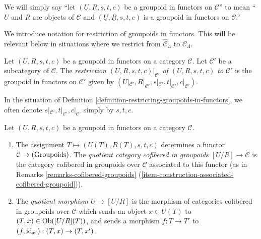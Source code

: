\begin{remark}
\label{remark-simplify-terminology}
We will simply say ``let $(\underline{U}, \underline{R}, s,t,c)$ be a groupoid 
in functors on $\mathcal C$'' to mean ``$U$ and $R$ are objects of $\mathcal C$ 
and $(\underline{U}, \underline{R}, s,t,c)$ is a groupoid in functors on 
$\mathcal C$.''
\end{remark}

\noindent
We introduce notation for restriction of groupoids in functors. This will be 
relevant below in situations where we restrict from $\widehat{\mathcal 
C}_{\Lambda}$ to $\mathcal C_{\Lambda}$.

\begin{definition}
\label{definition-restricting-groupoids-in-functors}
Let $(U,R,s,t,c)$ be a groupoid in functors on a category $\mathcal C$.  Let 
$\mathcal C'$ be a subcategory of $\mathcal C$.  The {\it restriction 
$(U,R,s,t,c)|_{\mathcal C'}$ of $(U,R,s,t,c)$ to $\mathcal C'$} is the groupoid 
in functors on $\mathcal C'$ given by $(U|_{\mathcal C'},R|_{\mathcal 
C'},s|_{\mathcal C'},t|_{\mathcal C'},c|_{\mathcal C'})$.
\end{definition}

\begin{remark}
\label{remark-notation-restriction}
In the situation of Definition 
\ref{definition-restricting-groupoids-in-functors}, we often denote 
$s|_{\mathcal C'},t|_{\mathcal C'},c|_{\mathcal C'}$ simply by $s,t,c$.
\end{remark}

\begin{definition}
\label{definition-quotient}
Let $(U,R,s,t,c)$ be a groupoid in functors on a category $\mathcal C$. 
\begin{enumerate}
\item The assignment $T \mapsto  (U(T), R(T), s,t,c)$ determines a functor 
$\mathcal C \rightarrow \textnormal{(Groupoids)}$. The {\it quotient category 
cofibered in groupoids $[U/R] \rightarrow \mathcal C$} is the category 
cofibered in groupoids over $\mathcal C$ associated to this functor (as in 
Remarks \ref{remarks-cofibered-groupoids} 
(\ref{item-construction-associated-cofibered-groupoid})).  
\item The {\it quotient morphism $U \rightarrow [U/R]$} is the morphism of 
categories cofibered in groupoids over $\mathcal C$ which sends an object $x 
\in U(T)$ to $(T,x) \in \textnormal{Ob}([U/R](T))$, and sends a morphism $f: T 
\rightarrow T'$ to $(f, \textnormal{id}_{x'}): (T,x) \rightarrow (T,x')$.
\end{enumerate} 
\end{definition}





